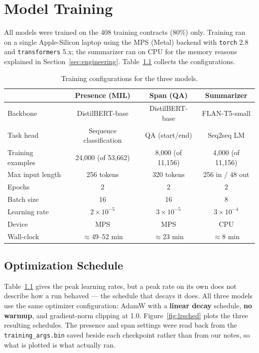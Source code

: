 \chapter{Model Training}

All models were trained on the 408 training contracts (80\%) only. Training ran on a single Apple-Silicon laptop using the MPS (Metal) backend with \texttt{torch} 2.8 and \texttt{transformers} 5.x; the summarizer ran on CPU for the memory reasons explained in Section~\ref{sec:engineering}. Table~\ref{tab:hyper} collects the configurations.

\begin{table}[ht]
\centering
\caption{Training configurations for the three models.}
\label{tab:hyper}
\small
\begin{tabular}{lccc}
\toprule
 & \textbf{Presence (MIL)} & \textbf{Span (QA)} & \textbf{Summarizer}\\
\midrule
Backbone            & DistilBERT-base & DistilBERT-base & FLAN-T5-small\\
Task head           & Sequence classification & QA (start/end) & Seq2seq LM\\
Training examples   & 24{,}000 (of 53{,}662) & 8{,}000 (of 11{,}156) & 4{,}000 (of 11{,}156)\\
Max input length    & 256 tokens & 320 tokens & 256 in / 48 out\\
Epochs              & 2 & 2 & 2\\
Batch size          & 16 & 16 & 8\\
Learning rate       & $2\times10^{-5}$ & $3\times10^{-5}$ & $3\times10^{-4}$\\
Device              & MPS & MPS & CPU\\
Wall-clock          & $\approx$49--52 min & $\approx$23 min & $\approx$8 min\\
\bottomrule
\end{tabular}
\end{table}

\section{Optimization Schedule}
Table~\ref{tab:hyper} gives the peak learning rates, but a peak rate on its own does not describe how a run behaved --- the schedule that decays it does. All three models use the same optimizer configuration: AdamW with a \textbf{linear decay} schedule, \textbf{no warmup}, and gradient-norm clipping at 1.0. Figure~\ref{fig:lrsched} plots the three resulting schedules. The presence and span settings were read back from the \texttt{training\_args.bin} saved beside each checkpoint rather than from our notes, so what is plotted is what actually ran.

